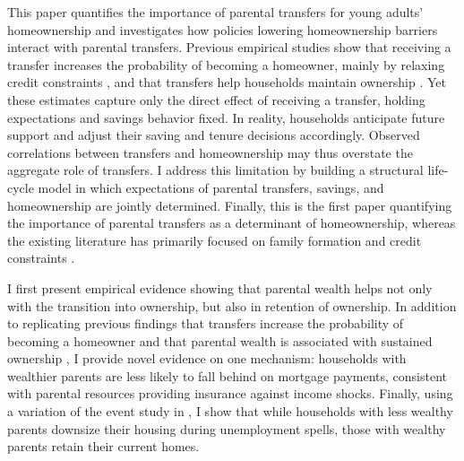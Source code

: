 \documentclass[12pt]{article}
\begin{document}
This paper quantifies the importance of parental transfers for young adults' homeownership and investigates how policies lowering homeownership barriers interact with parental transfers. Previous empirical studies show that receiving a transfer increases the probability of becoming a homeowner, mainly by relaxing credit constraints \citep[see e.g.,][]{Lee2018,Blickle2019,wold2024housing}, and that transfers help households maintain ownership \citep[e.g.,][]{bond2021role}. Yet these estimates capture only the direct effect of receiving a transfer, holding expectations and savings behavior fixed. In reality, households anticipate future support and adjust their saving and tenure decisions accordingly. Observed correlations between transfers and homeownership may thus overstate the aggregate role of transfers. I address this limitation by building a structural life-cycle model in which expectations of parental transfers, savings, and homeownership are jointly determined. Finally, this is the first paper quantifying the importance of parental transfers as a determinant of homeownership, whereas the existing literature has primarily focused on family formation and credit constraints \citep[see e.g.,][]{Chang2024,Paz-Pardo2019,Mabille2020}.

I first present empirical evidence showing that parental wealth helps not only with the transition into ownership, but also in retention of ownership. In addition to replicating previous findings that transfers increase the probability of becoming a homeowner and that parental wealth is associated with sustained ownership \citep[see e.g.,][]{Lee2018,bond2021role}, I provide novel evidence on one mechanism: households with wealthier parents are less likely to fall behind on mortgage payments, consistent with parental resources providing insurance against income shocks. Finally, using a variation of the event study in \cite{Chetty2007}, I show that while households with less wealthy parents downsize their housing during unemployment spells, those with wealthy parents retain their current homes.
\end{document}
